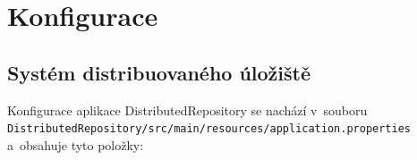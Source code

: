 


\chapter{Konfigurace} \label{configuration}
\section{Systém distribuovaného úložiště}
Konfigurace aplikace DistributedRepository se nachází v~souboru \\ \texttt{DistributedRepository/src/main/resources/application.properties} \\
a~obsahuje tyto položky:

